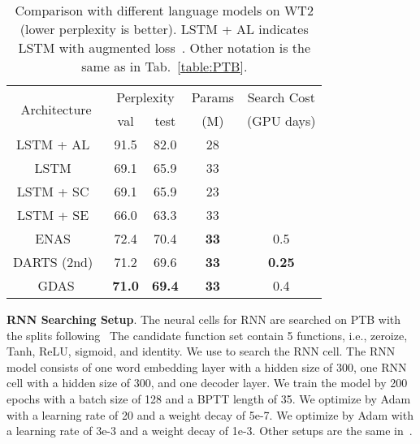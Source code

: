 \documentclass[10pt,twocolumn,letterpaper]{article}
\def\Tabref#1{Tab.~\ref{#1}}
\begin{document}
\begin{table}[t!]
\centering
\setlength{\tabcolsep}{4pt}
\begin{tabular}{| c | c | c | c | c |} \hline\hline

 \multirow{2}{*}{Architecture}          &  \multicolumn{2}{c|}{Perplexity} & Params & Search Cost \\\cline{2-3}
                                        &     val     &      test        & (M)    & (GPU days)  \\ \hline
LSTM + AL~\cite{inan2017tying}          &  91.5       &   82.0           & 28     &          \\
LSTM~\cite{merity2018regularizing}      &  69.1       &   65.9           & 33     &          \\
LSTM + SC~\cite{merity2018regularizing} &  69.1       &   65.9           & 23     &          \\
LSTM + SE~\cite{yang2018breaking}       &  66.0       &   63.3           & 33     &          \\
\hline\hline
ENAS~\cite{pmlr-v80-pham18a}            &  72.4       &   70.4           &\textbf{33}& 0.5          \\
DARTS (2nd)~\cite{liu2019darts}         &  71.2       &   69.6           &\textbf{33}&\textbf{0.25} \\\hline
GDAS                                    &\textbf{71.0}&\textbf{69.4}     &\textbf{33}& 0.4 \\\hline
\hline
\end{tabular}
\vspace{2mm}
\caption{
Comparison with different language models on WT2 (lower perplexity is better).
LSTM + AL indicates LSTM with augmented loss~\cite{inan2017tying}. Other notation is the same as in \Tabref{table:PTB}.
}
\vspace{-2mm}
\label{table:WT2}
\end{table}



\textbf{RNN Searching Setup}.
The neural cells for RNN are searched on PTB with the splits following~\cite{liu2019darts,pmlr-v80-pham18a}
The candidate function set  contain 5 functions, i.e., zeroize, Tanh, ReLU, sigmoid, and identity.
We use  to search the RNN cell.
The RNN model consists of one word embedding layer with a hidden size of 300, one RNN cell with a hidden size of 300, and one decoder layer.
We train the model by 200 epochs with a batch size of 128 and a BPTT length of 35.
We optimize  by Adam with a learning rate of 20 and a weight decay of 5e-7.
We optimize  by Adam with a learning rate of 3e-3 and a weight decay of 1e-3.
Other setups are the same in~\cite{pmlr-v80-pham18a,liu2019darts}.
\end{document}
